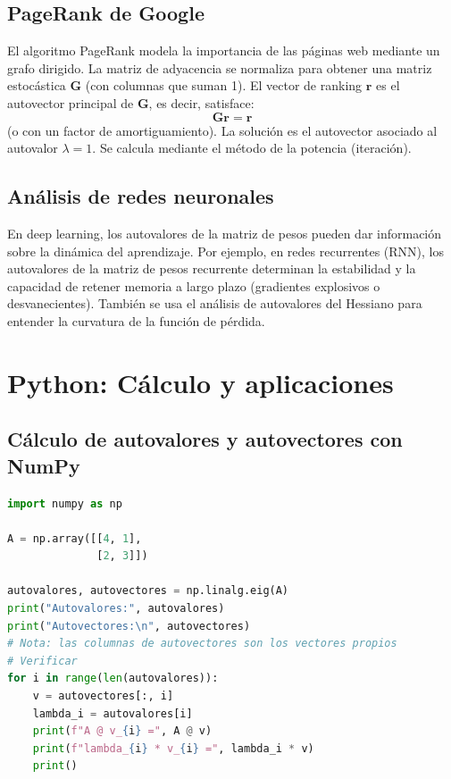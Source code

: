 \documentclass[12pt,a4paper,openany,oneside]{book}
\begin{document}
\subsection{PageRank de Google}
El algoritmo PageRank modela la importancia de las páginas web mediante un grafo dirigido. La matriz de adyacencia se normaliza para obtener una matriz estocástica $\mathbf{G}$ (con columnas que suman 1). El vector de ranking $\mathbf{r}$ es el autovector principal de $\mathbf{G}$, es decir, satisface:
\[
\mathbf{G} \mathbf{r} = \mathbf{r}
\]
(o con un factor de amortiguamiento). La solución es el autovector asociado al autovalor $\lambda = 1$. Se calcula mediante el método de la potencia (iteración).

\subsection{Análisis de redes neuronales}
En deep learning, los autovalores de la matriz de pesos pueden dar información sobre la dinámica del aprendizaje. Por ejemplo, en redes recurrentes (RNN), los autovalores de la matriz de pesos recurrente determinan la estabilidad y la capacidad de retener memoria a largo plazo (gradientes explosivos o desvanecientes). También se usa el análisis de autovalores del Hessiano para entender la curvatura de la función de pérdida.

\section{Python: Cálculo y aplicaciones}

\subsection{Cálculo de autovalores y autovectores con NumPy}
\begin{lstlisting}[language=Python]
import numpy as np

A = np.array([[4, 1],
              [2, 3]])

autovalores, autovectores = np.linalg.eig(A)
print("Autovalores:", autovalores)
print("Autovectores:\n", autovectores)
# Nota: las columnas de autovectores son los vectores propios
# Verificar
for i in range(len(autovalores)):
    v = autovectores[:, i]
    lambda_i = autovalores[i]
    print(f"A @ v_{i} =", A @ v)
    print(f"lambda_{i} * v_{i} =", lambda_i * v)
    print()
\end{lstlisting}
\end{document}
